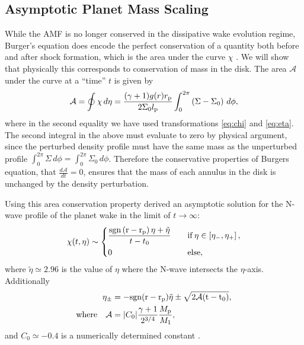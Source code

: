 \subsection{Asymptotic Planet Mass Scaling} \label{sec:asymptotic_N_wave}

While the AMF is no longer conserved in the dissipative wake evolution regime, Burger's equation does encode the perfect conservation of a quantity both before and after shock formation, which is the area under the curve $\chi$ \citep{landau1959,whitham1999}.
We will show that physically this corresponds to conservation of mass in the disk.
The area $\mathcal{A}$ under the curve at a ``time'' $t$ is given by
\begin{align}
    \mathcal{A} = \oint \chi \, d\eta = \frac{(\gamma + 1)g(r)r_{\rm p}}{2 \Sigma_0 l_{\rm p}} \int_0^{2\pi}  \left( \Sigma - \Sigma_0 \right) \, d\phi, 
\end{align}
where in the second equality we have used transformations \ref{eq:chi} and \ref{eq:eta}.
The second integral in the above must evaluate to zero by physical argument, since the perturbed density profile must have the same mass as the unperturbed profile $\int_0^{2 \pi} \Sigma \, d\phi = \int_0^{2 \pi} \Sigma_0 \, d\phi$.
Therefore the conservative properties of Burgers equation, that $\frac{d\mathcal{A}}{dt}=0$, ensures that the mass of each annulus in the disk is unchanged by the density perturbation.

Using this area conservation property \citet{bollati2021} derived an asymptotic solution for the N-wave profile of the planet wake in the limit of $t\rightarrow\infty$:
\begin{align}
    \chi(t, \eta) \sim \begin{dcases}
        \frac{\rm{sgn}\left(r - r_{\rm p}\right) \eta + \tilde{\eta}}{t - t_0} \quad &\rm{if} \, \eta \in \left[\eta_-, \eta_+ \right], \\
        0 \quad &\rm{else},
    \end{dcases}
\end{align}
where $\tilde{\eta} \simeq 2.96$ is the value of $\eta$ where the N-wave intersects the $\eta$-axis.
Additionally
\begin{align} 
    \eta_\pm &= - \rm{sgn}(r - r_{\rm p}) \tilde{\eta} \pm \sqrt{2 \mathcal{A} (t - t_0)}, \\
    \rm{where} \quad \mathcal{A} &= |C_0| \frac{\gamma + 1}{2^{3/4}} \frac{M_{\rm p}}{M_1},
\end{align}
and $C_0 \simeq -0.4$ is a numerically determined constant \citep{bollati2020}.

